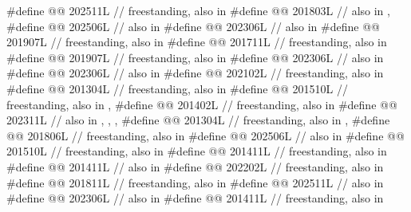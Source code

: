 \begin{codeblock}
#define @@                         202511L // freestanding, also in 
#define @@                           201803L // also in , 
#define @@                              202506L // also in 
#define @@                     202306L // also in 
#define @@              201907L // freestanding, also in 
#define @@                        201711L // freestanding, also in 
#define @@                          201907L // freestanding, also in 
#define @@                          202306L // also in 
#define @@                         202306L // also in 
#define @@                     202102L // freestanding, also in 
#define @@      201304L // freestanding, also in 
#define @@             201510L
  // freestanding, also in , 
#define @@                   201402L // freestanding, also in 
#define @@                        202311L
  // also in , , , 
#define @@                    201304L // freestanding, also in , 
#define @@                     201806L // freestanding, also in 
#define @@                        202506L // also in 
#define @@     201510L // freestanding, also in 
#define @@               201411L // freestanding, also in 
#define @@         201411L // also in 
#define @@                       202202L // freestanding, also in 
#define @@                        201811L // freestanding, also in 
#define @@                          202511L // also in 
#define @@                           202306L // also in 
#define @@                            201411L // freestanding, also in 
\end{codeblock}

